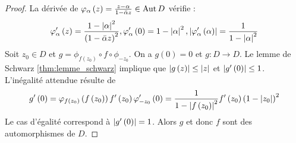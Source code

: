 \documentclass{cours}
\begin{document}
\begin{proof}
    La dérivée de $\varphi_{\alpha}\left(z\right) = \frac{z - \alpha}{1 - \bar{\alpha}z}\in \operatorname{Aut} D$ vérifie : 
    \begin{equation*}
        \varphi_{\alpha}'\left(z\right) = \frac{1 - \left|\alpha\right|^2}{\left(1 - \bar{\alpha}z\right)^{2}}, \varphi_{\alpha}'\left(0\right) = 1 - \left|\alpha\right|^{2}, \left|\varphi_{\alpha}'\left(\alpha\right)\right| = \frac{1}{1 - \left|\alpha\right|^{2}}
    \end{equation*}
    Soit $z_{0} \in D$ et $g = \phi_{f\left(z_{0}\right)} \circ f \circ \phi_{-z_{0}}$. On a $g\left(0\right) = 0$ et $g : D\to D$. Le lemme de Schwarz \ref{thm:lemme_schwarz} implique que $\left|g\left(z\right)\right| \leq \left|z\right|$ et $\left|g'\left(0\right)\right| \leq 1$. L'inégalité attendue résulte de 
    \begin{equation*}
        g'\left(0\right) = \varphi_{f\left(z_{0}\right)}\left(f\left(z_{0}\right)\right)f'\left(z_{0}\right)\varphi_{-z_{0}}'\left(0\right) = \frac{1}{1 - \left|f\left(z_{0}\right)\right|^{2}}f'\left(z_{0}\right)\left(1 - \left|z_{0}\right|\right)^{2}
    \end{equation*}
    Le cas d'égalité correspond à $\left|g'\left(0\right)\right| = 1$. Alors $g$ et donc $f$ sont des automorphismes de $D$. 
\end{proof}
\end{document}
